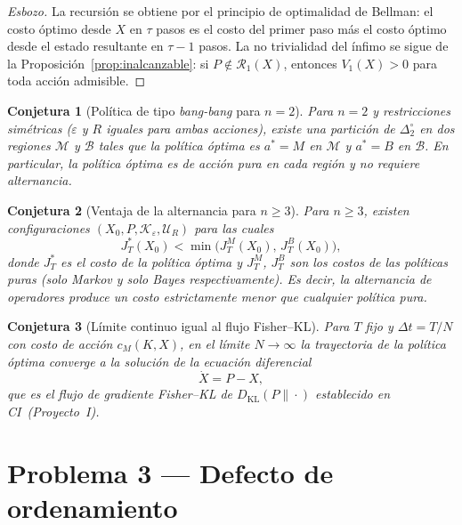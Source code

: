 \documentclass[12pt]{article}
\newtheorem{conjetura}{Conjetura}[section]
\begin{document}
\begin{proof}[Esbozo]
La recursión se obtiene por el principio de optimalidad de Bellman: el costo
óptimo desde $X$ en $\tau$ pasos es el costo del primer paso más el costo óptimo
desde el estado resultante en $\tau-1$ pasos. La no trivialidad del ínfimo se
sigue de la Proposición~\ref{prop:inalcanzable}: si $P\notin\mathcal{R}_1(X)$,
entonces $V_1(X)>0$ para toda acción admisible.
\end{proof}

\begin{conjetura}[Política de tipo \emph{bang-bang} para $n=2$]
\label{conj:bangbang}
Para $n=2$ y restricciones simétricas
($\varepsilon$ y $R$ iguales para ambas acciones), existe una partición de
$\Delta_2^\circ$ en dos regiones $\mathcal{M}$ y $\mathcal{B}$ tales que la
política óptima es $a^*=M$ en $\mathcal{M}$ y $a^*=B$ en $\mathcal{B}$. En
particular, la política óptima es de acción pura en cada región y no requiere
alternancia.
\end{conjetura}

\begin{conjetura}[Ventaja de la alternancia para $n\geq 3$]
\label{conj:alternancia}
Para $n\geq 3$, existen configuraciones $(X_0, P, \mathcal{K}_\varepsilon,
\mathcal{U}_R)$ para las cuales
\[
J_T^*(X_0)<\min\!\bigl(J_T^M(X_0),\,J_T^B(X_0)\bigr),
\]
donde $J_T^*$ es el costo de la política óptima y $J_T^M$, $J_T^B$ son los
costos de las políticas puras (solo Markov y solo Bayes respectivamente). Es
decir, la alternancia de operadores produce un costo estrictamente menor que
cualquier política pura.
\end{conjetura}

\begin{conjetura}[Límite continuo igual al flujo Fisher--KL]
\label{conj:limite-continuo}
Para $T$ fijo y $\Delta t=T/N$ con costo de acción $c_M(K,X)$, en el límite
$N\to\infty$ la trayectoria de la política óptima converge a la solución de la
ecuación diferencial
\[
\dot{X}=P-X,
\]
que es el flujo de gradiente Fisher--KL de $D_{\mathrm{KL}}(P\|\cdot)$
establecido en CI~(Proyecto~I).
\end{conjetura}

\section{Problema 3 --- Defecto de ordenamiento}
\end{document}
